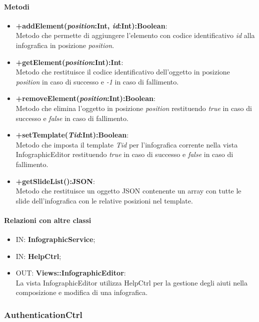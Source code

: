 	\paragraph{Metodi}
	\begin{itemize}
	  \item \textbf{+addElement(\textit{position}:Int, \textit{id}:Int):Boolean}:\\
		  Metodo che permette di aggiungere l'elemento con codice identificativo \textit{id} alla infografica in posizione \textit{position}.
	  \item \textbf{+getElement(\textit{position}:Int):Int}:\\
		  Metodo che restituisce il codice identificativo dell'oggetto in posizione \textit{position} in caso di successo e \textit{-1} in caso di fallimento.
	  \item \textbf{+removeElement(\textit{position}:Int):Boolean}:\\
		  Metodo che elimina l'oggetto in posizione \textit{position} restituendo \textit{true} in caso di successo e \textit{false} in caso di fallimento.
	  \item \textbf{+setTemplate(\textit{Tid}:Int):Boolean}:\\
		  Metodo che imposta il template \textit{Tid} per l'infografica corrente nella vista InfographicEditor restituendo \textit{true} in caso di successo e \textit{false} in caso di fallimento.
	  \item \textbf{+getSlideList():JSON}:\\
		  Metodo che restituisce un oggetto JSON contenente un array con tutte le slide dell'infografica con le relative posizioni nel template.
		  
	\end{itemize}
	\paragraph{Relazioni con altre classi}
	\begin{itemize}
		\item IN: \textbf{InfographicService};
		\item IN: \textbf{HelpCtrl};
		\item OUT: \textbf{Views::InfographicEditor}:\\
			La vista InfographicEditor utilizza HelpCtrl per la gestione degli aiuti nella composizione e modifica di una infografica. 	
	\end{itemize}
	
\subsubsection{AuthenticationCtrl}	
